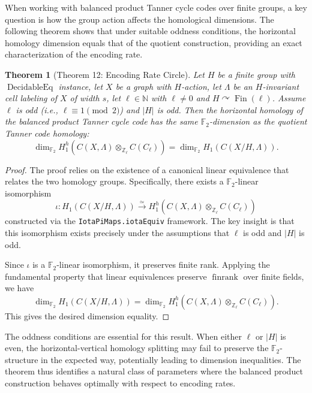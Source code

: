 \documentclass[11pt]{article}
\theoremstyle{plain}
\newtheorem*{theorem}{Theorem}
\theoremstyle{definition}
\theoremstyle{remark}
\begin{document}
When working with balanced product Tanner cycle codes over finite groups, a key question is how the group action affects the homological dimensions. The following theorem shows that under suitable oddness conditions, the horizontal homology dimension equals that of the quotient construction, providing an exact characterization of the encoding rate.

\begin{theorem}[Theorem 12: Encoding Rate Circle]
Let $H$ be a finite group with $\operatorname{DecidableEq}$ instance, let $X$ be a graph with $H$-action, let $\Lambda$ be an $H$-invariant cell labeling of $X$ of width $s$, let $\ell \in \mathbb{N}$ with $\ell \neq 0$ and $H \curvearrowright \operatorname{Fin}(\ell)$. Assume $\ell$ is odd (i.e., $\ell \equiv 1 \pmod{2}$) and $|H|$ is odd. Then the horizontal homology of the balanced product Tanner cycle code has the same $\mathbb{F}_2$-dimension as the quotient Tanner code homology:
\[
\dim_{\mathbb{F}_2} H_1^h\left(C(X, \Lambda) \otimes_{\mathbb{Z}_\ell} C(C_\ell)\right)
= \dim_{\mathbb{F}_2} H_1\left(C(X/H, \Lambda)\right).
\]
\end{theorem}

\begin{proof}
The proof relies on the existence of a canonical linear equivalence that relates the two homology groups. Specifically, there exists a $\mathbb{F}_2$-linear isomorphism 
\[
\iota: H_1(C(X/H,\Lambda)) \xrightarrow{\simeq} H_1^h\left(C(X, \Lambda) \otimes_{\mathbb{Z}_\ell} C(C_\ell)\right)
\]
constructed via the \texttt{IotaPiMaps.iotaEquiv} framework. The key insight is that this isomorphism exists precisely under the assumptions that $\ell$ is odd and $|H|$ is odd.

Since $\iota$ is a $\mathbb{F}_2$-linear isomorphism, it preserves finite rank. Applying the fundamental property that linear equivalences preserve $\operatorname{finrank}$ over finite fields, we have
\[
\dim_{\mathbb{F}_2} H_1(C(X/H,\Lambda)) = \dim_{\mathbb{F}_2} H_1^h\left(C(X, \Lambda) \otimes_{\mathbb{Z}_\ell} C(C_\ell)\right).
\]
This gives the desired dimension equality.
\end{proof}

The oddness conditions are essential for this result. When either $\ell$ or $|H|$ is even, the horizontal-vertical homology splitting may fail to preserve the $\mathbb{F}_2$-structure in the expected way, potentially leading to dimension inequalities. The theorem thus identifies a natural class of parameters where the balanced product construction behaves optimally with respect to encoding rates.
\end{document}
